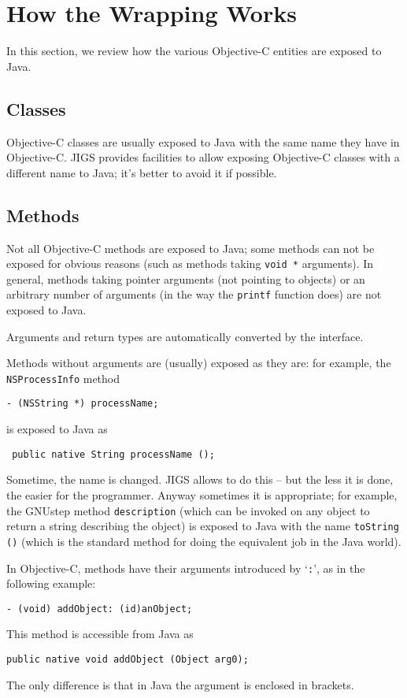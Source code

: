 \section{How the Wrapping Works}

In this section, we review how the various Objective-C entities are
exposed to Java.

\subsection{Classes}
Objective-C classes are usually exposed to Java with the same name
they have in Objective-C.  JIGS provides facilities to allow exposing
Objective-C classes with a different name to Java; it's better to
avoid it if possible.

\subsection{Methods}
Not all Objective-C methods are exposed to Java; some methods can not
be exposed for obvious reasons (such as methods taking \texttt{void *}
arguments).  In general, methods taking pointer arguments (not
pointing to objects) or an arbitrary number of arguments (in the way 
the \texttt{printf} function does) are not exposed to Java.

Arguments and return types are automatically converted by the interface.

Methods without arguments are (usually) exposed as they are: for example, 
the \texttt{NSProcessInfo} method
\begin{verbatim}
- (NSString *) processName;
\end{verbatim}
is exposed to Java as 
\begin{verbatim}
 public native String processName ();
\end{verbatim}

Sometime, the name is changed.  JIGS allows to do this -- but the less
it is done, the easier for the programmer.  Anyway sometimes it is
appropriate; for example, the GNUstep method \texttt{description}
(which can be invoked on any object to return a string describing the
object) is exposed to Java with the name \texttt{toString ()} (which
is the standard method for doing the equivalent job in the Java
world).  

In Objective-C, methods have their arguments introduced by
`\texttt{:}', as in the following example:
\begin{verbatim}
- (void) addObject: (id)anObject;
\end{verbatim}
This method is accessible from Java as
\begin{verbatim}
public native void addObject (Object arg0);
\end{verbatim}
The only difference is that in Java the argument is enclosed in 
brackets.

